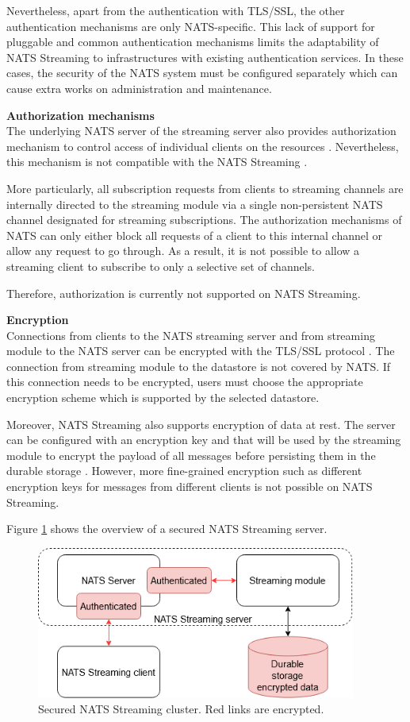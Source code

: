 Nevertheless, apart from the authentication with TLS/SSL, the other authentication mechanisms are only NATS-specific. This lack of support for pluggable and common authentication mechanisms limits the adaptability of NATS Streaming to infrastructures with existing authentication services. In these cases, the security of the NATS system must be configured separately which can cause extra works on administration and maintenance.

\textbf{Authorization mechanisms}\\
The underlying NATS server of the streaming server also provides authorization mechanism to control access of individual clients on the resources \cite{normalnatsconfig}. Nevertheless, this mechanism is not compatible with the NATS Streaming \cite{natsauthorization}. 

More particularly, all subscription requests from clients to streaming channels are internally directed to the streaming module via a single non-persistent NATS channel designated for streaming subscriptions. The authorization mechanisms of NATS can only either block all requests of a client to this internal channel or allow any request to go through. As a result, it is not possible to allow a streaming client to subscribe to only a selective set of channels. 

Therefore, authorization is currently not supported on NATS Streaming. 

\textbf{Encryption}\\
Connections from clients to the NATS streaming server and from streaming module to the NATS server can be encrypted with the TLS/SSL protocol \cite{normalnatsconfig}. The connection from streaming module to the datastore is not covered by NATS. If this connection needs to be encrypted, users must choose the appropriate encryption scheme which is supported by the selected datastore.

Moreover, NATS Streaming also supports encryption of data at rest. The server can be configured with an encryption key and that will be used by the streaming module to encrypt the payload of all messages before persisting them in the durable storage \cite{natstoreencryption}. However, more fine-grained encryption such as different encryption keys for messages from different clients is not possible on NATS Streaming.

Figure \ref{fig:securitynats} shows the overview of a secured NATS Streaming server.
\begin{figure}[h]
	\centering
	\includegraphics[width=10.5cm]{images/security-nats.png}
	\caption{Secured NATS Streaming cluster. Red links are encrypted.}
	\label{fig:securitynats}
\end{figure}
